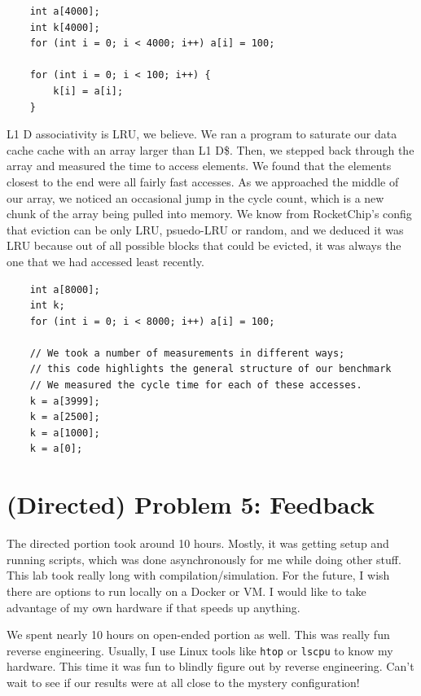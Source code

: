 \documentclass[11pt]{article}
\begin{document}
\lstset{language=c}
\begin{lstlisting}
	int a[4000];
	int k[4000];
	for (int i = 0; i < 4000; i++) a[i] = 100;

	for (int i = 0; i < 100; i++) {
    	k[i] = a[i];
	}
\end{lstlisting}

L1 D associativity is LRU, we believe. We ran a program to saturate our data cache cache with an array larger than L1 D\$. Then, we stepped back through the array and measured the time to access elements. We found that the elements closest to the end were all fairly fast accesses. As we approached the middle of our array, we noticed an occasional jump in the cycle count, which is a new chunk of the array being pulled into memory. We know from RocketChip's config that eviction can be only LRU, psuedo-LRU or random, and we deduced it was LRU because out of all possible blocks that could be evicted, it was always the one that we had accessed least recently.

\lstset{language=c}
\begin{lstlisting}
	int a[8000];
	int k;
	for (int i = 0; i < 8000; i++) a[i] = 100;

	// We took a number of measurements in different ways; 
	// this code highlights the general structure of our benchmark
	// We measured the cycle time for each of these accesses.
	k = a[3999];
	k = a[2500];
	k = a[1000];
	k = a[0];            
\end{lstlisting}

\newpage

\section*{(Directed) Problem 5: Feedback}
The directed portion took around 10 hours. Mostly, it was getting setup and running scripts, which was done asynchronously for me while doing other stuff. This lab took really long with compilation/simulation. For the future, I wish there are options to run locally on a Docker or VM. I would like to take advantage of my own hardware if that speeds up anything.

We spent nearly 10 hours on open-ended portion as well. This was really fun reverse engineering. Usually, I use Linux tools like \verb|htop| or \verb|lscpu| to know my hardware. This time it was fun to blindly figure out by reverse engineering. Can't wait to see if our results were at all close to the mystery configuration!
\end{document}
